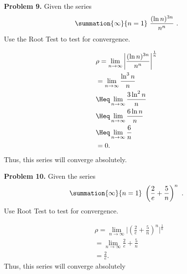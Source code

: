 \documentclass{report}
\begin{document}
   \bigbreak \noindent 
   \begin{mdframed}
       \textbf{Problem 9.} Given the series
       \begin{align*}
           \summation{\infty}{n=1}\ \frac{(\ln{n})^{3n}}{n^{n}}\ 
       .\end{align*}
       Use the Root Test to test for convergence.
   \end{mdframed}
   \bigbreak \noindent 
   \begin{align*}
       &\rho = \lim\limits_{n \to \infty}{\bigg\lvert \frac{(\ln{n})^{3n}}{n^{n}} \bigg\rvert^{\frac{1}{n}}} \\
       &=\lim\limits_{n \to \infty}{\frac{\ln^{3}{n}}{n}} \\
       &\Heq \lim\limits_{n \to \infty}{\frac{3\ln^{2}{n}}{n}} \\
       &\Heq \lim\limits_{n \to \infty}{\frac{6\ln{n}}{n}} \\
       &\Heq \lim\limits_{n \to \infty}\frac{6}{n}{} \\
       &=0
   .\end{align*}
   \bigbreak \noindent 
   Thus, this series will converge absolutely.

   \pagebreak \bigbreak \noindent 
   \begin{mdframed}
       \textbf{Problem 10.} Given the series
       \begin{align*}
           \summation{\infty}{n=1}\ \left(\frac{2}{e} + \frac{5}{n}\right)^{n}\ 
       .\end{align*}
       \bigbreak \noindent 
       Use Root Test to test for convergence.
   \end{mdframed}
   \bigbreak \noindent 
   \begin{align*}
       &\rho = \lim\limits_{n \to \infty}{\bigg\lvert \left(\frac{2}{e} + \frac{5}{n}\right)^{n} \bigg\rvert^{\frac{1}{n}}} \\
       &=\lim\limits_{n \to \infty}{\frac{2}{e}  + \frac{5}{n}} \\
       &=\frac{2}{e}
   .\end{align*}
   \bigbreak \noindent 
   Thus, this series will converge absolutely




    
\end{document}
